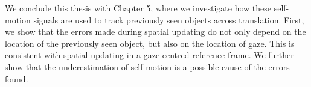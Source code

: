 We conclude this thesis with Chapter 5, where we investigate how these self-motion signals are used to track previously seen objects across translation. First, we show that the errors made during spatial updating do not only depend on the location of the previously seen object, but also on the location of gaze. This is consistent with spatial updating in a gaze-centred reference frame. We further show that the underestimation of self-motion is a possible cause of the errors found.
